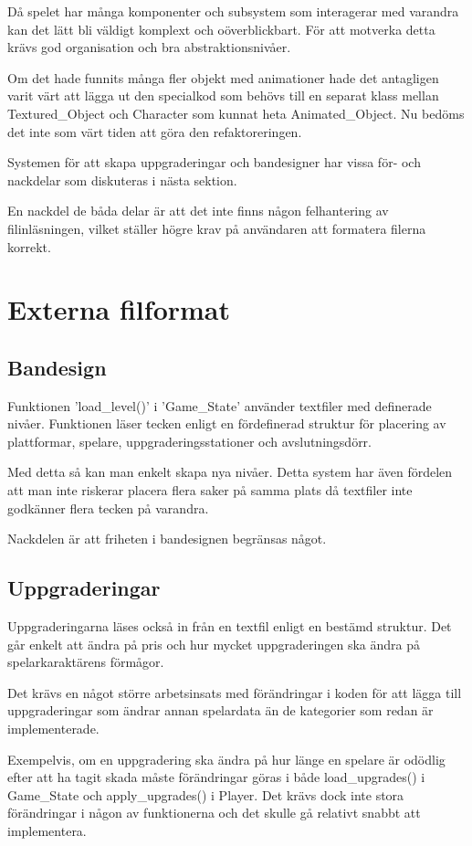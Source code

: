\documentclass{TDP005mall}
\begin{document}
Då spelet har många komponenter och subsystem som interagerar med varandra kan det lätt bli väldigt komplext och oöverblickbart. För att motverka detta krävs god organisation och bra abstraktionsnivåer. 

Om det hade funnits många fler objekt med animationer hade det antagligen varit värt att lägga ut den specialkod som behövs till en separat klass mellan Textured\_Object och Character som kunnat heta Animated\_Object. Nu bedöms det inte som värt tiden att göra den refaktoreringen. 

Systemen för att skapa uppgraderingar och bandesigner har vissa för- och nackdelar som diskuteras i nästa sektion. 

En nackdel de båda delar är att det inte finns någon felhantering av filinläsningen, vilket ställer högre krav på användaren att formatera filerna korrekt.

\section{Externa filformat} 
\subsection{Bandesign}
Funktionen 'load\_level()' i 'Game\_State' använder textfiler med definerade nivåer. Funktionen läser tecken enligt en fördefinerad struktur för placering av plattformar, spelare, uppgraderingsstationer och avslutningsdörr. 

Med detta så kan man enkelt skapa nya nivåer. Detta system har även fördelen att man inte riskerar placera flera saker på samma plats då textfiler inte godkänner flera tecken på varandra.

Nackdelen är att friheten i bandesignen begränsas något.

\subsection{Uppgraderingar}
Uppgraderingarna läses också in från en textfil enligt en bestämd struktur. Det går enkelt att ändra på pris och hur mycket uppgraderingen ska ändra på spelarkaraktärens förmågor. 

Det krävs en något större arbetsinsats med förändringar i koden för att lägga till uppgraderingar som ändrar annan spelardata än de kategorier som redan är implementerade. 

Exempelvis, om en uppgradering ska ändra på hur länge en spelare är odödlig efter att ha tagit skada måste förändringar göras i både load\_upgrades() i Game\_State och apply\_upgrades() i Player. Det krävs dock inte stora förändringar i någon av funktionerna och det skulle gå relativt snabbt att implementera. 
\end{document}
